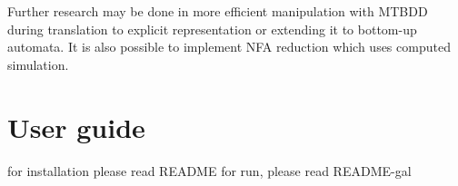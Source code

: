 \documentclass[a4paper, 12pt]{article}
\begin{document}
Further research may be done in more efficient manipulation with MTBDD during translation to explicit representation or
extending it to bottom-up automata.
It is also possible to implement NFA reduction which uses computed simulation.

\newpage
\appendix
\section{User guide}
\label{app:usage}

for installation please read README
for run, please read README-gal




\end{document}
